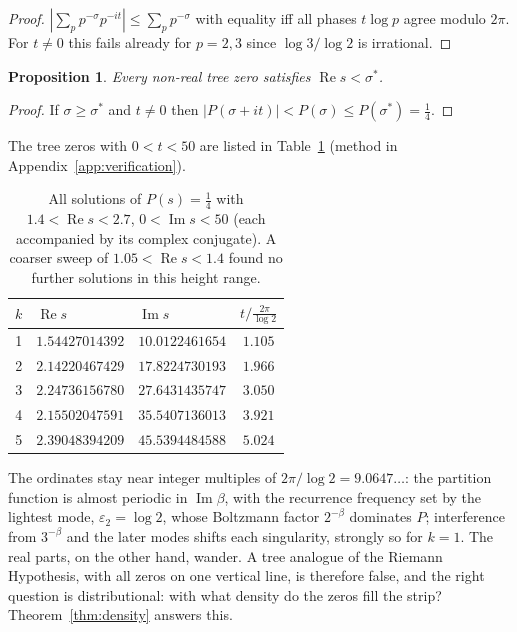 \documentclass[11pt]{article}
\numberwithin{equation}{section}
\theoremstyle{plain}
\newtheorem{proposition}[theorem]{Proposition}
\theoremstyle{definition}
\theoremstyle{remark}
\begin{document}
\begin{proof}
$|\sum_p p^{-\sigma} p^{-it}| \le \sum_p p^{-\sigma}$ with equality iff all phases
$t \log p$ agree modulo $2\pi$. For $t \ne 0$ this fails already for $p = 2, 3$ since
$\log 3/\log 2$ is irrational.
\end{proof}

\begin{proposition}\label{prop:strip}
Every non-real tree zero satisfies $\operatorname{Re} s < \sigma^{*}$.
\end{proposition}

\begin{proof}
If $\sigma \ge \sigma^{*}$ and $t \neq 0$ then
$|P(\sigma+it)| < P(\sigma) \le P(\sigma^{*}) = \tfrac14$.
\end{proof}

The tree zeros with $0 < t < 50$ are listed in Table~\ref{tab:zeros} (method in
Appendix~\ref{app:verification}).

\begin{table}[ht]
\centering
\begin{tabular}{@{}cllc@{}}
\toprule
$k$ & $\operatorname{Re} s$ & $\operatorname{Im} s$ & $t \big/ \tfrac{2\pi}{\log 2}$ \\
\midrule
1 & $1.54427014392$ & $10.0122461654$ & $1.105$ \\
2 & $2.14220467429$ & $17.8224730193$ & $1.966$ \\
3 & $2.24736156780$ & $27.6431435747$ & $3.050$ \\
4 & $2.15502047591$ & $35.5407136013$ & $3.921$ \\
5 & $2.39048394209$ & $45.5394484588$ & $5.024$ \\
\bottomrule
\end{tabular}
\caption{All solutions of $P(s) = \tfrac14$ with $1.4 < \operatorname{Re} s < 2.7$,
$0 < \operatorname{Im} s < 50$ (each accompanied by its complex conjugate). A coarser
sweep of $1.05 < \operatorname{Re} s < 1.4$ found no further solutions in this height
range.}
\label{tab:zeros}
\end{table}

The ordinates stay near integer multiples of $2\pi/\log 2 = 9.0647\dots$: the
partition function is almost periodic in $\operatorname{Im}\beta$, with the
recurrence frequency set by the lightest mode, $\varepsilon_2 = \log 2$, whose
Boltzmann factor $2^{-\beta}$ dominates $P$; interference from $3^{-\beta}$ and the
later modes shifts each singularity, strongly so for $k=1$. The real parts, on the
other hand, wander. A tree analogue of the Riemann Hypothesis, with all zeros on one
vertical line, is therefore false, and the right question is distributional: with
what density do the zeros fill the strip? Theorem~\ref{thm:density} answers this.
\end{document}
